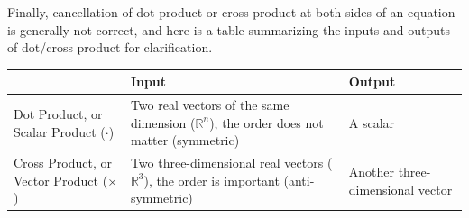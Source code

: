 Finally, cancellation of dot product or cross product at both sides of an equation is generally not correct, and here is a table summarizing the inputs and outputs of dot/cross product for clarification.
\begin{center}
\begin{tabular}{|p{30mm}|p{55mm}|p{25mm}|}
\hline
 & Input & Output \\
\hline
Dot Product, or Scalar Product ($\cdot$) & Two real vectors of the same dimension ($\mathbb{R}^n$), the order does not matter (symmetric) & A scalar\\
\hline
Cross Product, or Vector Product ($\times$) & Two three-dimensional real vectors ($\mathbb{R}^3$), the order is important (anti-symmetric) & Another three-dimensional vector
\\
\hline
\end{tabular}
\end{center}

